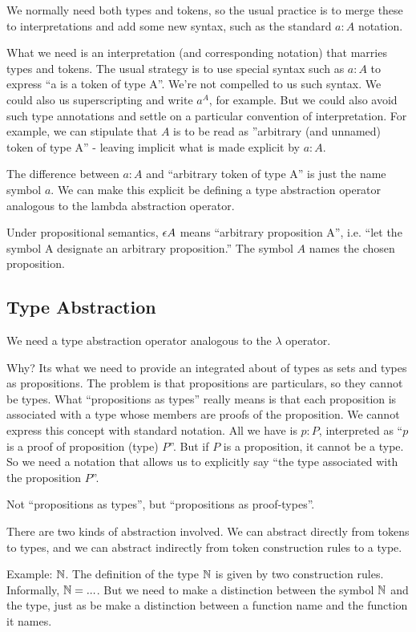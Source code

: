 \documentclass{article}
\begin{document}
We normally need both types and tokens, so the usual practice is to
merge these to interpretations and add some new syntax, such as the
standard \(a:A\) notation.

What we need is an interpretation (and corresponding notation) that
marries types and tokens. The usual strategy is to use special syntax
such as \(a:A\) to express ``a is a token of type A''. We're not
compelled to us such syntax. We could also us superscripting and write
\(a^A\), for example. But we could also avoid such type annotations
and settle on a particular convention of interpretation. For example,
we can stipulate that \(A\) is to be read as ''arbitrary (and unnamed)
token of type A'' - leaving implicit what is made explicit by \(a:A\).

The difference between \(a:A\) and ``arbitrary token of type A'' is
just the name symbol \(a\). We can make this explicit be defining a
type abstraction operator analogous to the lambda abstraction
operator.

Under propositional semantics, \(\epsilon A\) means ``arbitrary
proposition A'', i.e. ``let the symbol A designate an arbitrary
proposition.''  The symbol \(A\) names the chosen proposition.

\subsection{Type Abstraction}

We need a type abstraction operator analogous to the \(\lambda\)
operator.

Why? Its what we need to provide an integrated about of types as sets
and types as propositions. The problem is that propositions are
particulars, so they cannot be types. What ``propositions as types''
really means is that each proposition is associated with a type whose
members are proofs of the proposition. We cannot express this concept
with standard notation. All we have is \(p:P\), interpreted as ``\(p\)
is a proof of proposition (type) \(P\)''. But if \(P\) is a
proposition, it cannot be a type. So we need a notation that allows us
to explicitly say ``the type associated with the proposition \(P\)''.

Not ``propositions as types'', but ``propositions as proof-types''.

There are two kinds of abstraction involved. We can abstract directly
from tokens to types, and we can abstract indirectly from token
construction rules to a type.

Example: \(\mathbb{N}\). The definition of the type \(\mathbb{N}\) is given by two
construction rules. Informally, \(\mathbb{N} = ...\). But we need to make a
distinction between the symbol \(\mathbb{N}\) and the type, just as be make
a distinction between a function name and the function it names.
\end{document}
